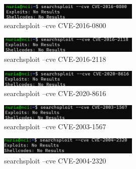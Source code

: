 \documentclass[a4paper,12pt]{article} %
\begin{document}
\newpage

            \begin{figure} [hp!]
             \centering
             \includegraphics[width=0.6\textwidth]{imagenes/cvelinux8.png}
             \caption{ searchsploit --cve CVE-2016-0800}
             \label{fig:linux8}
            \end{figure}

            \begin{figure} [hp!]
             \centering
             \includegraphics[width=0.6\textwidth]{imagenes/cvelinux9.png}
             \caption{ searchsploit --cve CVE-2016-2118}
             \label{fig:linux9}
            \end{figure}

            \begin{figure} [hp!]
             \centering
             \includegraphics[width=0.6\textwidth]{imagenes/cvelinux10.png}
             \caption{ searchsploit --cve CVE-2020-8616}
             \label{fig:linux10}
            \end{figure}

            \begin{figure} [hp!]
             \centering
             \includegraphics[width=0.6\textwidth]{imagenes/cvelinux11.png}
             \caption{ searchsploit --cve CVE-2003-1567}
             \label{fig:linux11}
            \end{figure}

            \begin{figure} [hp!]
             \centering
             \includegraphics[width=0.6\textwidth]{imagenes/cvelinux12.png}
             \caption{ searchsploit --cve  CVE-2004-2320}
             \label{fig:linux12}
            \end{figure}
\end{document}
